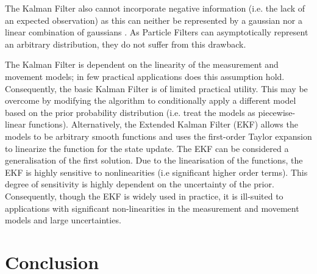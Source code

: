 \documentclass[english]{article}
\begin{document}
The Kalman Filter also cannot incorporate negative information (i.e. the lack of an expected observation) as this can neither be represented by a gaussian nor a linear combination of gaussians \cite{Thrun02d}. As Particle Filters can asymptotically represent an arbitrary distribution, they do not suffer from this drawback.

The Kalman Filter is dependent on the linearity of the measurement and movement models; in few practical applications does this assumption hold. Consequently, the basic Kalman Filter is of limited practical utility. This may be overcome by  modifying the algorithm to conditionally apply a different model based on the prior probability distribution (i.e. treat the models as piecewise-linear functions). Alternatively, the Extended Kalman Filter (EKF) allows the models to be arbitrary smooth functions and uses the first-order Taylor expansion to linearize the function for the state update. The EKF can be considered a generalisation of the first solution. Due to the linearisation of the functions, the EKF is highly sensitive to nonlinearities (i.e significant higher order terms). This degree of sensitivity is highly dependent on the uncertainty of the prior\cite{probrob}. Consequently, though the EKF is widely used in practice\cite{probrob}, it is ill-suited to applications with significant non-linearities in the measurement and movement models and large uncertainties.




\section{Conclusion}



\end{document}
